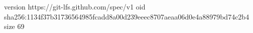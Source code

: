 version https://git-lfs.github.com/spec/v1
oid sha256:1134f37b31736564985fcadd8a00d239eeec8707aeaa06d0e4a88979bd74c2b4
size 69
